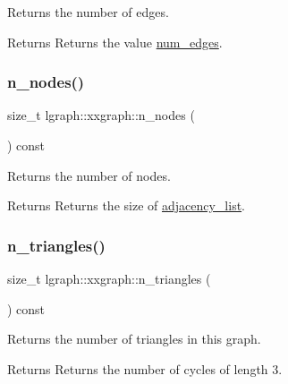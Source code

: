 Returns the number of edges. 

\begin{DoxyReturn}{Returns}
Returns the value \hyperlink{classlgraph_1_1xxgraph_a6765a9a3be42f6e0f824635c593b35d7}{num\+\_\+edges}. 
\end{DoxyReturn}
\mbox{\label{classlgraph_1_1xxgraph_a67f651617ada4053b569102b9a54cab0}} 
\subsubsection{\texorpdfstring{n\+\_\+nodes()}{n\_nodes()}}
{\footnotesize\ttfamily size\+\_\+t lgraph\+::xxgraph\+::n\+\_\+nodes (\begin{DoxyParamCaption}{ }\end{DoxyParamCaption}) const\hspace{0.3cm}{\ttfamily [inherited]}}



Returns the number of nodes. 

\begin{DoxyReturn}{Returns}
Returns the size of \hyperlink{classlgraph_1_1xxgraph_a31cf82d0b20be05290be259dc97a51ec}{adjacency\+\_\+list}. 
\end{DoxyReturn}
\mbox{\label{classlgraph_1_1xxgraph_a90a9b60caf18179576af61dc962b95e3}} 
\subsubsection{\texorpdfstring{n\+\_\+triangles()}{n\_triangles()}}
{\footnotesize\ttfamily size\+\_\+t lgraph\+::xxgraph\+::n\+\_\+triangles (\begin{DoxyParamCaption}{ }\end{DoxyParamCaption}) const\hspace{0.3cm}{\ttfamily [inherited]}}



Returns the number of triangles in this graph. 

\begin{DoxyReturn}{Returns}
Returns the number of cycles of length 3. 
\end{DoxyReturn}
\mbox{\label{classlgraph_1_1wxgraph_a205fb7f32445d4caa36ee47609103e47}} 
